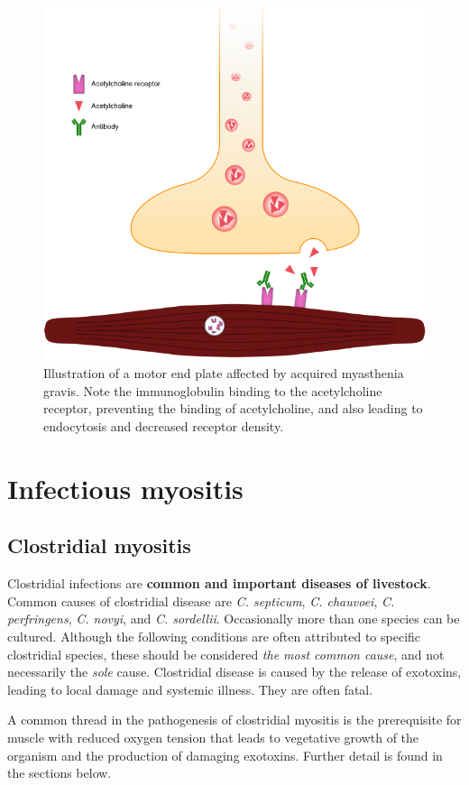 \documentclass[openany]{report}
\begin{document}
\begin{figure}

{\centering \includegraphics[width=0.5\linewidth]{images/acq-myasthenia} 

}

\caption{Illustration of a motor end plate affected by acquired myasthenia gravis. Note the immunoglobulin binding to the acetylcholine receptor, preventing the binding of acetylcholine, and also leading to endocytosis and decreased receptor density.}\label{fig:acq-myasthenia}
\end{figure}

\chapter{Infectious myositis}\label{infectious-myositis}

\section{Clostridial myositis}\label{clostridial-myositis}

Clostridial infections are \textbf{common and important diseases of
livestock}. Common causes of clostridial disease are \emph{C. septicum},
\emph{C. chauvoei}, \emph{C. perfringens}, \emph{C. novyi}, and \emph{C.
sordellii}. Occasionally more than one species can be cultured. Although
the following conditions are often attributed to specific clostridial
species, these should be considered \emph{the most common cause}, and
not necessarily the \emph{sole} cause. Clostridial disease is caused by
the release of exotoxins, leading to local damage and systemic illness.
They are often fatal.

A common thread in the pathogenesis of clostridial myositis is the
prerequisite for muscle with reduced oxygen tension that leads to
vegetative growth of the organism and the production of damaging
exotoxins. Further detail is found in the sections below.
\end{document}
